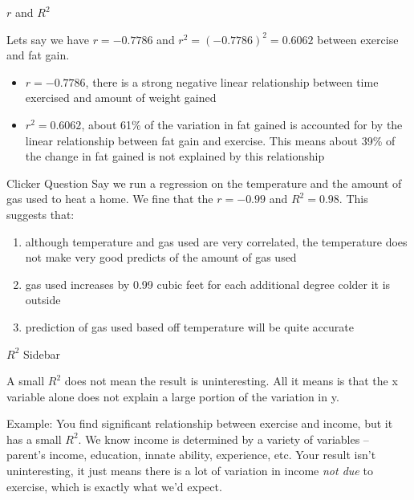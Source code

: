 \documentclass{beamer}
\begin{document}
\begin{frame}{$r$ and $R^2$}
	
	Lets say we have $r=-0.7786$ and $r^2=(-0.7786)^2=0.6062$ between exercise and fat gain. 
	
	\begin{itemize}
		\item $r=-0.7786$, there is a strong negative linear relationship between time exercised and amount of weight gained
		\item $r^2=0.6062$, about 61\% of the variation in fat gained is accounted for by the linear relationship between fat gain and exercise. This means about 39\% of the change in fat gained is not explained by this relationship
	\end{itemize}
	
\end{frame}

\begin{frame}{Clicker Question}
	Say we run a regression on the temperature and the amount of gas used to heat a home. We fine that the $r=-0.99$ and $R^2=0.98$. This suggests that:
	
	\begin{enumerate}[label=(\alph*)]
		\item although temperature and gas used are very correlated, the temperature does not make very good predicts of the amount of gas used
		\item gas used increases by 0.99 cubic feet for each additional degree colder it is outside 
		\item prediction of gas used based off temperature will be quite accurate
	\end{enumerate}
\end{frame}

\begin{frame}{$R^2$ Sidebar}
	
	A small $R^2$ does not mean the result is uninteresting. All it means is that the x variable alone does not explain a large portion of the variation in y.
	
	Example: You find significant relationship between exercise and income, but it has a small $R^2$. We know income is determined by a variety of variables -- parent's income, education, innate ability, experience, etc. Your result isn't uninteresting, it just means there is a lot of variation in income \textit{not due} to exercise, which is exactly what we'd expect.
	
\end{frame}
\end{document}
